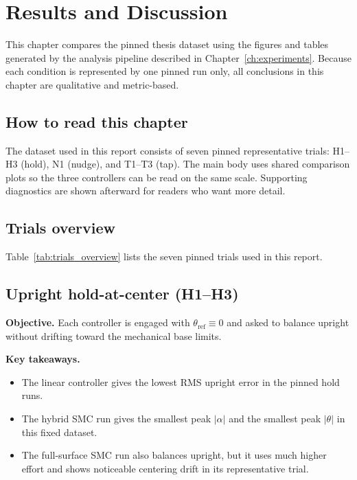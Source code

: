 \chapter{Results and Discussion}
\label{ch:results}

This chapter compares the pinned thesis dataset using the figures and tables generated by the analysis pipeline described in Chapter~\ref{ch:experiments}. Because each condition is represented by one pinned run only, all conclusions in this chapter are qualitative and metric-based.

\section{How to read this chapter}
The dataset used in this report consists of seven pinned representative trials: H1--H3 (hold), N1 (nudge), and T1--T3 (tap). The main body uses shared comparison plots so the three controllers can be read on the same scale. Supporting diagnostics are shown afterward for readers who want more detail.

\section{Trials overview}
\noindent Table~\ref{tab:trials_overview} lists the seven pinned trials used in this report.
\clearpage

\section{Upright hold-at-center (H1--H3)}
\noindent\textbf{Objective.} Each controller is engaged with $\theta_{\mathrm{ref}} \equiv 0$ and asked to balance upright without drifting toward the mechanical base limits.

\noindent\textbf{Key takeaways.}
\begin{itemize}
  \item The linear controller gives the lowest RMS upright error in the pinned hold runs.
  \item The hybrid SMC run gives the smallest peak $|\alpha|$ and the smallest peak $|\theta|$ in this fixed dataset.
  \item The full-surface SMC run also balances upright, but it uses much higher effort and shows noticeable centering drift in its representative trial.
\end{itemize}

